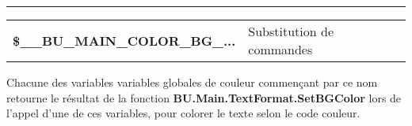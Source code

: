 \documentclass[a4paper,10pt]{article}
\begin{document}

    \par\noindent\rule{\textwidth}{0.4pt}

    \begin{justify}
        \begin{tabular}{l|l}
            \textbf{\color{vars}\$\_\_BU\_MAIN\_COLOR\_BG\_...} & Substitution de commandes\\
        \end{tabular}
    \end{justify}

    \begin{justify}
        Chacune des variables variables globales de couleur commençant par ce nom retourne le résultat de la fonction \textbf{\color{func}BU.Main.TextFormat.SetBGColor} lors de l'appel d'une de ces variables, pour colorer le texte selon le code couleur.
    \end{justify}
\end{document}

